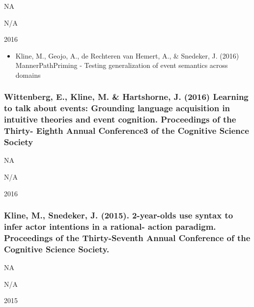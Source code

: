 \documentclass[
]{article}
\providecommand{\tightlist}{%
  \setlength{\itemsep}{0pt}\setlength{\parskip}{0pt}}
\begin{document}
NA

N/A

2016

\begin{itemize}
\tightlist
\item
  Kline, M., Geojo, A., de Rechteren van Hemert, A., \& Snedeker, J.
  (2016) MannerPathPriming - Testing generalization of event semantics
  across domains
\end{itemize}

\hypertarget{wittenberg-e.-kline-m.-hartshorne-j.-2016-learning-to-talk-about-events-grounding-language-acquisition-in-intuitive-theories-and-event-cognition.-proceedings-of-the-thirty--eighth-annual-conference3-of-the-cognitive-science-society}{%
\subsubsection{Wittenberg, E., Kline, M. \& Hartshorne, J. (2016)
Learning to talk about events: Grounding language acquisition in
intuitive theories and event cognition. Proceedings of the Thirty-
Eighth Annual Conference3 of the Cognitive Science
Society}\label{wittenberg-e.-kline-m.-hartshorne-j.-2016-learning-to-talk-about-events-grounding-language-acquisition-in-intuitive-theories-and-event-cognition.-proceedings-of-the-thirty--eighth-annual-conference3-of-the-cognitive-science-society}}

NA

N/A

2016

\hypertarget{kline-m.-snedeker-j.-2015.-2-year-olds-use-syntax-to-infer-actor-intentions-in-a-rational--action-paradigm.-proceedings-of-the-thirty-seventh-annual-conference-of-the-cognitive-science-society.}{%
\subsubsection{Kline, M., Snedeker, J. (2015). 2-year-olds use syntax to
infer actor intentions in a rational- action paradigm. Proceedings of
the Thirty-Seventh Annual Conference of the Cognitive Science
Society.}\label{kline-m.-snedeker-j.-2015.-2-year-olds-use-syntax-to-infer-actor-intentions-in-a-rational--action-paradigm.-proceedings-of-the-thirty-seventh-annual-conference-of-the-cognitive-science-society.}}

NA

N/A

2015
\end{document}
